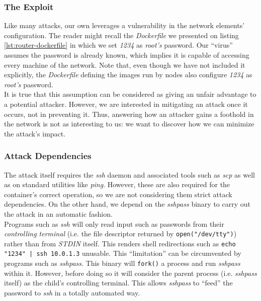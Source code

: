         \subsubsection{The Exploit}
            Like many attacks, our own leverages a vulnerability in the network elements' configuration. The reader might recall the \textit{Dockerfile} we presented on listing \ref{lst:router-dockerfile} in which we set \textit{1234} as \textit{root's} password. Our ``virus'' assumes the password is already known, which implies it is capable of accessing every machine of the network. Note that, even though we have not included it explicitly, the \textit{Dockerfile} defining the images run by nodes also configure \textit{1234} as \textit{root's} password.\\

            It is true that this assumption can be considered as giving an unfair advantage to a potential attacker. However, we are interested in mitigating an attack once it occurs, not in preventing it. Thus, answering how an attacker gains a foothold in the network is not as interesting to us: we want to discover how we can minimize the attack's impact.\\

        \subsubsection{Attack Dependencies}
            The attack itself requires the \textit{ssh} daemon and associated tools such as \textit{scp} as well as on standard utilities like \textit{ping}. However, these are also required for the container's correct operation, so we are not considering them strict attack dependencies. On the other hand, we depend on the \textit{sshpass} binary to carry out the attack in an automatic fashion.\\

            Programs such as \textit{ssh} will only read input such as passwords from their \textit{controlling terminal} (i.e. the file descriptor returned by \texttt{open("/dev/tty")}) rather than from \textit{STDIN} itself. This renders shell redirections such as \texttt{echo "1234" | ssh 10.0.1.3} unusable. This ``limitation'' can be circumvented by programs such as \textit{sshpass}. This binary will \texttt{fork()} a process and run \textit{sshpass} within it. However, before doing so it will consider the parent process (i.e. \textit{sshpass} itself) as the child's controlling terminal. This allows \textit{sshpass} to ``feed'' the password to \textit{ssh} in a totally automated way.\\

